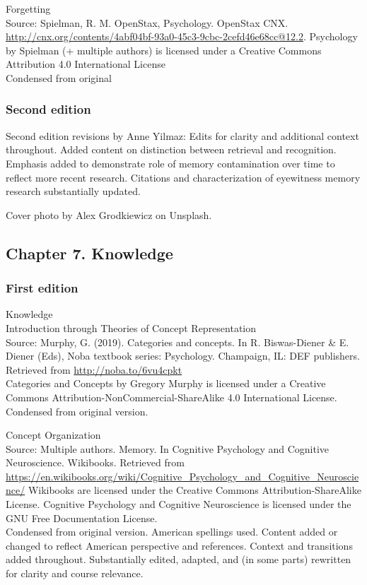 \documentclass[
]{krantz}
\begin{document}
Forgetting\\
Source: Spielman, R. M. OpenStax, Psychology. OpenStax CNX. \url{http://cnx.org/contents/4abf04bf-93a0-45c3-9cbc-2cefd46e68cc@12.2}.
Psychology by Spielman (+ multiple authors) is licensed under a Creative Commons Attribution 4.0 International License\\
Condensed from original

\subsubsection*{Second edition}\label{second-edition-6}


Second edition revisions by Anne Yilmaz: Edits for clarity and additional context throughout. Added content on distinction between retrieval and recognition. Emphasis added to demonstrate role of memory contamination over time to reflect more recent research. Citations and characterization of eyewitness memory research substantially updated.

Cover photo by Alex Grodkiewicz on Unsplash.

\subsection*{Chapter 7. Knowledge}\label{chapter-7.-knowledge}


\subsubsection*{First edition}\label{first-edition-7}


Knowledge\\
Introduction through Theories of Concept Representation\\
Source: Murphy, G. (2019). Categories and concepts. In R. Biswas-Diener \& E. Diener (Eds), Noba textbook series: Psychology. Champaign, IL: DEF publishers. Retrieved from \url{http://noba.to/6vu4cpkt}\\
Categories and Concepts by Gregory Murphy is licensed under a Creative Commons Attribution-NonCommercial-ShareAlike 4.0 International License.\\
Condensed from original version.

Concept Organization\\
Source: Multiple authors. Memory. In Cognitive Psychology and Cognitive Neuroscience. Wikibooks. Retrieved from \url{https://en.wikibooks.org/wiki/Cognitive_Psychology_and_Cognitive_Neuroscience/}
Wikibooks are licensed under the Creative Commons Attribution-ShareAlike License.
Cognitive Psychology and Cognitive Neuroscience is licensed under the GNU Free Documentation License.\\
Condensed from original version. American spellings used. Content added or changed to reflect American perspective and references. Context and transitions added throughout. Substantially edited, adapted, and (in some parts) rewritten for clarity and course relevance.
\end{document}

